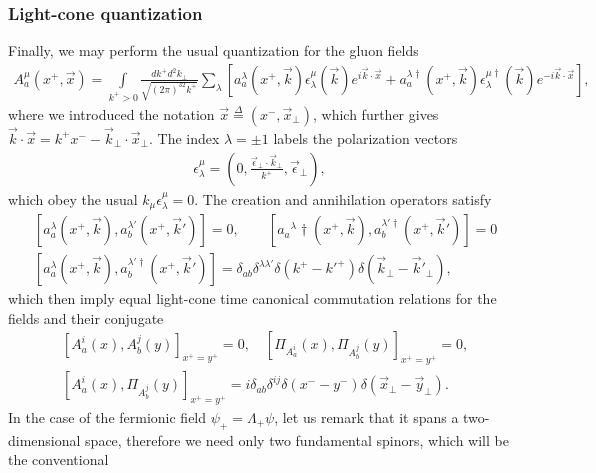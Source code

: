\subsubsection*{Light-cone quantization}
Finally, we may perform the usual quantization for the gluon fields 
\begin{align}\label{lc34}
A_a^\mu(x^+,\vec{x})=\int\limits_{k^+>0}\frac{dk^+d^2k_\perp}{\sqrt{(2\pi)^32k^+}}\sum_\lambda \left[a_a^\lambda(x^+,\vec{k})\epsilon_\lambda^\mu(\vec{k})e^{i\vec{k}\cdot \vec{x}}+a_a^{\lambda\dag}(x^+,\vec{k})\epsilon_\lambda^{\mu\dagger}(\vec{k})e^{-i\vec{k}\cdot \vec{x}}\right],
\end{align}
where we introduced the notation $\vec{x}\overset{\Delta}{=}(x^-,\vec{x}_\perp)$, which further gives $\vec{k}\cdot\vec{x}=k^+x^--\vec{k}_\perp\cdot\vec{x}_\perp$. The index $\lambda=\pm 1$ labels the polarization vectors
\begin{equation*}
\begin{aligned}
\epsilon^\mu_\lambda=\left(0,\frac{\vec{\epsilon}_\perp\cdot \vec{k}_\perp}{k^+},\vec{\epsilon}_\perp\right),
\end{aligned}
\end{equation*}
which obey the usual $k_\mu\epsilon^\mu_\lambda=0$. The creation and annihilation operators satisfy
\begin{equation}\label{lc42}
\begin{aligned}
&\left[a_a^\lambda(x^+,\vec{k}),a_b^{\lambda'}(x^+,\vec{k}')\right]=0,\qquad \left[a_a{^\lambda\dag}(x^+,\vec{k}),a_b^{\lambda'\dag}(x^+,\vec{k}')\right]=0\\
&\left[a_a^\lambda(x^+,\vec{k}),a_b^{\lambda'\dag}(x^+,\vec{k}')\right]=\delta_{ab}\delta^{\lambda\lambda'}\delta(k^+-k'^+)\delta(\vec{k}_\perp-\vec{k}'_\perp),
\end{aligned}
\end{equation}
which then imply equal light-cone time canonical commutation relations for the fields and their conjugate
\begin{equation*}
\begin{aligned}
&\left[A_a^i(x),A_b^j(y)\right]_{x^+=y^+}=0,\quad\left[\Pi_{A_a^i}(x),\Pi_{A_b^j}(y)\right]_{x^+=y^+}=0,\\
&\left[A_a^i(x),\Pi_{A_b^j}(y)\right]_{x^+=y^+}=i\delta_{ab}\delta^{ij}\delta(x^--y^-)\delta(\vec{x}_\perp-\vec{y}_\perp).
\end{aligned}
\end{equation*}
In the case of the fermionic field $\psi_+=\Lambda_+\psi$, let us remark that it spans a two-dimensional space, therefore we need only two fundamental spinors, which will be the conventional
